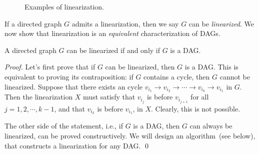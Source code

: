 \begin{figure}[h!]
\centering{}
\caption{Examples of linearization.}
\end{figure}

If a directed graph $G$ admits a linearization, then we say $G$ can be \emph{linearized}.
We now show that linearization is an \emph{equivalent} characterization of DAGs.

\begin{claim}
A directed graph $G$ can be linearized if and only if $G$ is a DAG.
\label{claim:dag}
\end{claim}

\emph{Proof.}  Let's first prove that if $G$ can be linearized, then $G$ is a DAG.
This is equivalent to proving its contraposition: if $G$ contains a cycle, then $G$ cannot be linearized.
Suppose that there exists an cycle $v_{i_1} \to v_{i_2} \to \cdots \to v_{i_k} \to v_{i_1}$ in $G$.
Then the linearization $X$ must satisfy that $v_{i_{j}}$ is before $v_{i_{j+1}}$ for all $j = 1, 2, \cdots, k-1$,
and that $v_{i_{k}}$ is before $v_{i_1}$, in $X$. Clearly, this is not possible.

The other side of the statement, i.e., if $G$ is a DAG, then $G$ can always be linearized, can be proved constructively.
We will design an algorithm~(see below), that constructs a linearization for any DAG. \qed


